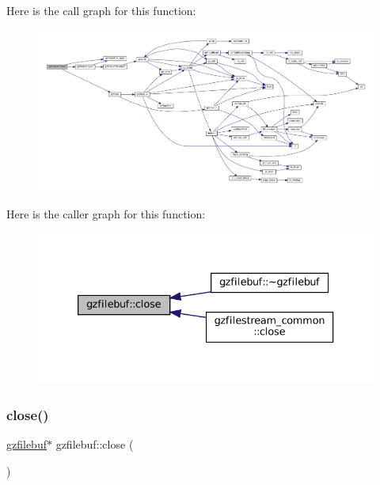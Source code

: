 Here is the call graph for this function\+:
\nopagebreak
\begin{figure}[H]
\begin{center}
\leavevmode
\includegraphics[width=350pt]{classgzfilebuf_a18e628926f455f41d7715c2ddd9c0e64_cgraph}
\end{center}
\end{figure}
Here is the caller graph for this function\+:
\nopagebreak
\begin{figure}[H]
\begin{center}
\leavevmode
\includegraphics[width=333pt]{classgzfilebuf_a18e628926f455f41d7715c2ddd9c0e64_icgraph}
\end{center}
\end{figure}
\mbox{\label{classgzfilebuf_a280d1c661fb371c22de1214d5a1682a2}} 
\subsubsection{\texorpdfstring{close()}{close()}\hspace{0.1cm}{\footnotesize\ttfamily [2/2]}}
{\footnotesize\ttfamily \mbox{\hyperlink{classgzfilebuf}{gzfilebuf}}$\ast$ gzfilebuf\+::close (\begin{DoxyParamCaption}{ }\end{DoxyParamCaption})}



